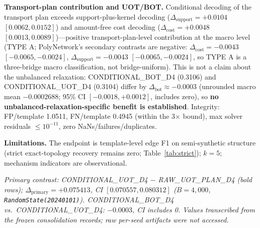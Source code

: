 \textbf{Transport-plan contribution and UOT/BOT.} Conditional decoding of the transport plan exceeds support-plus-kernel decoding ($\Delta_{\mathrm{support}}=+0.0104$ $[0.0062,0.0152]$) and amount-free cost decoding ($\Delta_{\mathrm{cost}}=+0.0048$ $[0.0013,0.0089]$)---positive transport-plan-level contribution at the macro level (TYPE A; PolyNetwork's secondary contrasts are negative: $\Delta_{\mathrm{cost}}=-0.0043$ $[-0.0065,-0.0024]$, $\Delta_{\mathrm{support}}=-0.0043$ $[-0.0065,-0.0024]$, so TYPE A is a three-bridge macro classification, not bridge-uniform). This is not a claim about the unbalanced relaxation: CONDITIONAL\_BOT\_D4 (0.3106) and CONDITIONAL\_UOT\_D4 (0.3104) differ by $\Delta_{\mathrm{bot}}\approx-0.0003$ (unrounded macro mean $-0.0002688$; 95\% CI $[-0.0018,+0.0012]$, includes zero), so \textbf{no unbalanced-relaxation-specific benefit is established}. Integrity: FP/template 1.0511, FN/template 0.4945 (within the 3$\times$ bound), max solver residuals $\le 10^{-11}$, zero NaNs/failures/duplicates.

\textbf{Limitations.} The endpoint is template-level edge F1 on semi-synthetic structure (strict exact-topology recovery remains zero; Table~\ref{tab:strict}); $k=5$; mechanism indicators are observational.

\begin{table}[!t]
\caption{Preregistered confirmatory holdout (seeds 301--305), five frozen decoding methods.}
\label{tab:confirmatory}
\centering
\footnotesize
{}
\end{table}

\emph{Primary contrast: CONDITIONAL\_UOT\_D4 $-$ RAW\_UOT\_PLAN\_D4 (bold rows); $\Delta_{\mathrm{primary}}=+0.075413$, CI $[0.070557,0.080312]$ ($B=4{,}000$, \texttt{RandomState(20240101)}). CONDITIONAL\_BOT\_D4 vs.\ CONDITIONAL\_UOT\_D4: $-0.0003$, CI includes 0. Values transcribed from the frozen consolidation records; raw per-seed artifacts were not accessed.}

